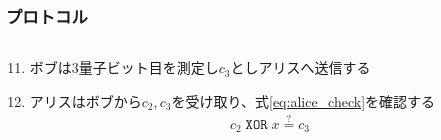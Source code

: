 \begin{frame}
  \frametitle{プロトコル}

  \begin{columns}
    \begin{column}{0.5\textwidth}
    \end{column}
    \begin{column}{0.5\textwidth}
    \end{column}
  \end{columns}

  \begin{enumerate}
    \setcounter{enumi}{10}

    \item ボブは3量子ビット目を測定し$c_3$としアリスへ送信する
    \begin{figure}
    \end{figure}

    \item アリスはボブから$c_2, c_3$を受け取り、式\ref{eq:alice_check}を確認する
    \begin{align}
      c_2\; \mathtt{XOR}\; x \stackrel{?}{=} c_3 \label{eq:alice_check}
    \end{align}
  \end{enumerate}
\end{frame}

